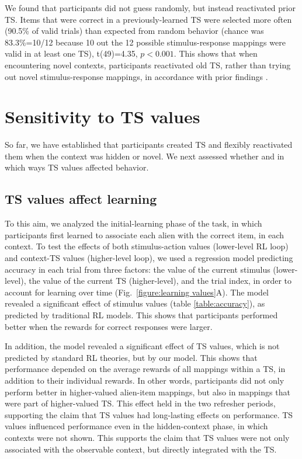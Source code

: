 \documentclass[10pt, letterpaper]{article}
\begin{document}
We found that participants did not guess randomly, but instead reactivated prior TS. Items that were correct in a previously-learned TS were selected more often (90.5\% of valid trials) than expected from random behavior (chance was 83.3\%=10/12 because 10 out the 12 possible stimulus-response mappings were valid in at least one TS), t(49)=4.35, $p<0.001$. This shows that when encountering novel contexts, participants reactivated old TS, rather than trying out novel stimulus-response mappings, in accordance with prior findings \cite{collins_cognitive_2013}.


\section{Sensitivity to TS values}

So far, we have established that participants created TS and flexibly reactivated them when the context was hidden or novel. We next assessed whether and in which ways TS values affected behavior.


\subsection{TS values affect learning}

To this aim, we analyzed the initial-learning phase of the task, in which participants first learned to associate each alien with the correct item, in each context. To test the effects of both stimulus-action values (lower-level RL loop) and context-TS values (higher-level loop), we used a regression model predicting accuracy in each trial from three factors: the value of the current stimulus (lower-level), the value of the current TS (higher-level), and the trial index, in order to account for learning over time (Fig.~\ref{figure:learning values}A). The model revealed a significant effect of stimulus values (table \ref{table:accuracy}), as predicted by traditional RL models. This shows that participants performed better when the rewards for correct responses were larger.

In addition, the model revealed a significant effect of TS values, which is not predicted by standard RL theories, but by our model. This shows that performance depended on the average rewards of all mappings within a TS, in addition to their individual rewards. In other words, participants did not only perform better in higher-valued alien-item mappings, but also in mappings that were part of higher-valued TS. This effect held in the two refresher periods, supporting the claim that TS values had long-lasting effects on performance. TS values influenced performance even in the hidden-context phase, in which contexts were not shown. This supports the claim that TS values were not only associated with the observable context, but directly integrated with the TS.
\end{document}
